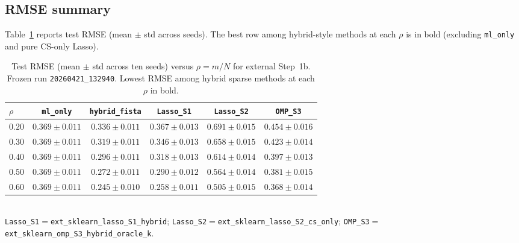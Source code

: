 \subsection{RMSE summary}
\label{sec:external_table}

Table~\ref{tab:external_rmse} reports test RMSE (mean $\pm$ std across seeds).
The best row among hybrid-style methods at each $\rho$ is in bold (excluding \texttt{ml\_only} and pure CS-only Lasso).

\begin{table}[t]
  \centering
  \caption{Test RMSE (mean $\pm$ std across ten seeds) versus $\rho=m/N$ for external Step~1b.
  Frozen run \texttt{20260421\_132940}. Lowest RMSE among hybrid sparse methods at each $\rho$ in bold.}
  \label{tab:external_rmse}
  \small
  \begin{tabular}{@{}lccccc@{}}
    \toprule
    $\rho$ & \texttt{ml\_only} & \texttt{hybrid\_fista} & \texttt{Lasso\_S1} & \texttt{Lasso\_S2} & \texttt{OMP\_S3} \\
    \midrule
    $0.20$ & $0.369 \pm 0.011$ & $\mathbf{0.336 \pm 0.011}$ & $0.367 \pm 0.013$ & $0.691 \pm 0.015$ & $0.454 \pm 0.016$ \\
    $0.30$ & $0.369 \pm 0.011$ & $\mathbf{0.319 \pm 0.011}$ & $0.346 \pm 0.013$ & $0.658 \pm 0.015$ & $0.423 \pm 0.014$ \\
    $0.40$ & $0.369 \pm 0.011$ & $\mathbf{0.296 \pm 0.011}$ & $0.318 \pm 0.013$ & $0.614 \pm 0.014$ & $0.397 \pm 0.013$ \\
    $0.50$ & $0.369 \pm 0.011$ & $\mathbf{0.272 \pm 0.011}$ & $0.290 \pm 0.012$ & $0.564 \pm 0.014$ & $0.381 \pm 0.015$ \\
    $0.60$ & $0.369 \pm 0.011$ & $\mathbf{0.245 \pm 0.010}$ & $0.258 \pm 0.011$ & $0.505 \pm 0.015$ & $0.368 \pm 0.014$ \\
    \bottomrule
  \end{tabular}
  \\[0.4em]
  {\footnotesize \texttt{Lasso\_S1}${}=${}\texttt{ext\_sklearn\_lasso\_S1\_hybrid};
  \texttt{Lasso\_S2}${}=${}\texttt{ext\_sklearn\_lasso\_S2\_cs\_only};
  \texttt{OMP\_S3}${}=${}\texttt{ext\_sklearn\_omp\_S3\_hybrid\_oracle\_k}.}
\end{table}

